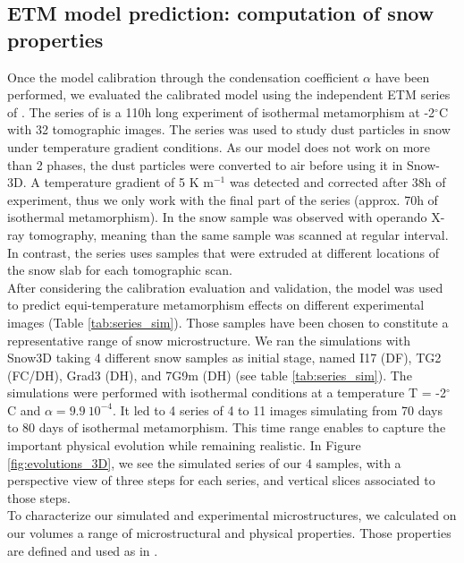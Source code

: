 \documentclass[draft,ms]{agujournal2019}
\begin{document}
\subsection{ETM model prediction: computation of snow properties}
\label{subsec:methode_physical_appli}
Once the model calibration through the condensation coefficient $\alpha$ have been performed, we evaluated the calibrated model using the independent ETM series of . The series of  is a 110h long experiment of isothermal metamorphism at -2$^\circ$C with 32 tomographic images. The series was used to study dust particles in snow under temperature gradient conditions. As our model does not work on more than 2 phases, the dust particles were converted to air before using it in Snow-3D. A temperature gradient of 5 K m$^{-1}$ was detected and corrected after 38h of experiment, thus we only work with the final part of the series (approx. 70h of isothermal metamorphism). In  the snow sample was observed with operando X-ray tomography, meaning than the same sample was scanned at regular interval. In contrast, the  series uses samples that were extruded at different locations of the snow slab for each tomographic scan.\\

After considering the calibration evaluation and validation, the model was used to predict equi-temperature metamorphism effects on different experimental images (Table \ref{tab:series_sim}). Those samples have been chosen to constitute a representative range of snow microstructure. We ran the simulations with Snow3D taking 4 different snow samples as initial stage, named I17 (DF), TG2 (FC/DH), Grad3 (DH), and 7G9m (DH) (see table \ref{tab:series_sim}). The simulations were performed with isothermal conditions at a temperature T = -2$^\circ$C and $\alpha = 9.9\ 10^{-4}$. It led to 4 series of 4 to 11 images simulating from 70 days to 80 days of isothermal metamorphism. This time range enables to capture the important physical evolution while remaining realistic. In Figure \ref{fig:evolutions_3D}, we see the simulated series of our 4 samples, with a perspective view of three steps for each series, and vertical slices associated to those steps.\\

To characterize our simulated and experimental microstructures, we calculated on our volumes a range of microstructural and physical properties. Those properties are defined and used as in .
\end{document}
